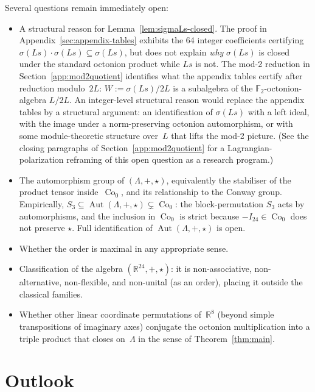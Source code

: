 \documentclass[twoside,english]{paper}
\numberwithin{equation}{section}
\numberwithin{figure}{section}
\theoremstyle{definition}
\theoremstyle{remark}
\newcommand{\RR}{\mathbb{R}}
\newcommand{\FF}{\mathbb{F}}
\newcommand{\LL}{\Lambda}             %
\DeclareMathOperator{\Co}{Co}
\DeclareMathOperator{\Aut}{Aut}
\begin{document}
Several questions remain immediately open:
\begin{itemize}
\item A structural reason for Lemma~\ref{lem:sigmaLs-closed}.  The
  proof in Appendix~\ref{sec:appendix-tables} exhibits the 64
  integer coefficients certifying $\sigma(Ls)\cdot\sigma(Ls) \subseteq
  \sigma(Ls)$, but does not explain \emph{why} $\sigma(Ls)$ is closed
  under the standard octonion product while $Ls$ is not.  The mod-2
  reduction in Section~\ref{app:mod2quotient} identifies what the
  appendix tables certify after reduction modulo~$2L$: $W :=
  \sigma(Ls)/2L$ is a subalgebra of the $\FF_2$-octonion-algebra
  $L/2L$.  An integer-level structural reason would replace the
  appendix tables by a structural argument: an identification of
  $\sigma(Ls)$ with a left ideal, with the image under a
  norm-preserving octonion automorphism, or with some
  module-theoretic structure over~$L$ that lifts the mod-2 picture.  (See the
  closing paragraphs of Section~\ref{app:mod2quotient} for a
  Lagrangian-polarization reframing of this open question as a
  research program.)
\item The automorphism group of $(\LL, +, \star)$, equivalently
  the stabiliser of the product tensor inside~$\Co_0$, and its
  relationship to the Conway group.  Empirically,
  $S_3 \subseteq \Aut(\LL, +, \star) \subsetneq \Co_0$: the
  block-permutation $S_3$ acts by automorphisms, and the inclusion
  in $\Co_0$ is strict because $-I_{24} \in \Co_0$ does not preserve
  $\star$.  Full identification of $\Aut(\LL, +, \star)$ is open.
\item Whether the order is maximal in any appropriate sense.
\item Classification of the algebra $(\RR^{24}, +, \star)$: it is
  non-associative, non-alternative, non-flexible, and non-unital
  (as an order), placing it outside the classical families.
\item Whether other linear coordinate permutations of~$\RR^8$
  (beyond simple transpositions of imaginary axes) conjugate the
  octonion multiplication into a triple product that closes
  on~$\LL$ in the sense of Theorem~\ref{thm:main}.
\end{itemize}

\section{Outlook}\label{sec:outlook}
\end{document}
